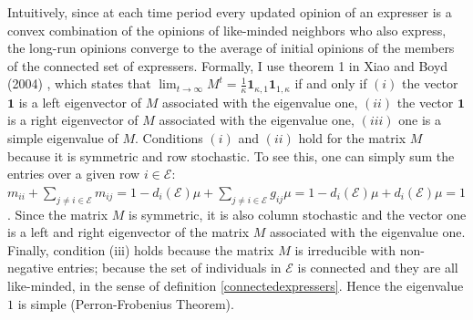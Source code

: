 \documentclass{article}
\begin{document}
Intuitively, since at each time period every updated opinion of an expresser is a convex combination of the opinions of like-minded neighbors who also express, the long-run opinions converge to the average of initial opinions of the members of the connected set of expressers. Formally, I use theorem 1 in Xiao and Boyd (2004) \cite{xiao}, which states that $\lim_{t \rightarrow \infty} M^t = \frac{1}{\kappa} \mathbf{1}_{\kappa,1} \mathbf{1}_{1,\kappa}$ if and only if $(i)$ the vector $\mathbf{1}$ is a left eigenvector of $M$ associated with the eigenvalue one, $(ii)$ the vector $\mathbf{1}$ is a right eigenvector of $M$ associated with the eigenvalue one, $(iii)$ one is a simple eigenvalue of $M$. Conditions $(i)$ and $(ii)$ hold for the matrix $M$ because it is symmetric and row stochastic. To see this, one can simply sum the entries over a given row $i \in \mathcal{E}$: $m_{ii} + \sum_{j \neq i \in \mathcal{E}} m_{ij} = 1 - d_i (\mathcal{E}) \mu + \sum_{j \neq i \in \mathcal{E}}   g_{ij} \mu = 1 - d_i (\mathcal{E}) \mu + d_i (\mathcal{E}) \mu = 1$. Since the matrix $M$ is symmetric, it is also column stochastic and the vector one is a  left and right eigenvector of the matrix $M$ associated with the eigenvalue one. Finally, condition (iii) holds because the matrix $M$ is irreducible with non-negative entries;  because the set of individuals in $\mathcal{E}$ is connected and they are all like-minded, in the sense of definition \ref{connectedexpressers}. Hence the eigenvalue $1$ is simple (Perron-Frobenius Theorem). 
%
\end{document}
